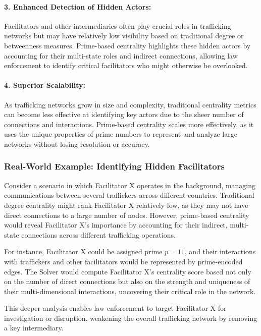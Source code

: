 \documentclass[%
 preprint, linenumbers,
 amsmath,amssymb,
 aps, physrev,
]{revtex4-2}
\begin{document}
\paragraph{3. Enhanced Detection of Hidden Actors:}
Facilitators and other intermediaries often play crucial roles in trafficking networks but may have relatively low visibility based on traditional degree or betweenness measures. Prime-based centrality highlights these hidden actors by accounting for their multi-state roles and indirect connections, allowing law enforcement to identify critical facilitators who might otherwise be overlooked.

\paragraph{4. Superior Scalability:}
As trafficking networks grow in size and complexity, traditional centrality metrics can become less effective at identifying key actors due to the sheer number of connections and interactions. Prime-based centrality scales more effectively, as it uses the unique properties of prime numbers to represent and analyze large networks without losing resolution or accuracy.

\subsubsection{Real-World Example: Identifying Hidden Facilitators}

Consider a scenario in which Facilitator X operates in the background, managing communications between several traffickers across different countries. Traditional degree centrality might rank Facilitator X relatively low, as they may not have direct connections to a large number of nodes. However, prime-based centrality would reveal Facilitator X’s importance by accounting for their indirect, multi-state connections across different trafficking operations.

For instance, Facilitator X could be assigned prime \(p = 11\), and their interactions with traffickers and other facilitators would be represented by prime-encoded edges. The Solver would compute Facilitator X’s centrality score based not only on the number of direct connections but also on the strength and uniqueness of their multi-dimensional interactions, uncovering their critical role in the network.

This deeper analysis enables law enforcement to target Facilitator X for investigation or disruption, weakening the overall trafficking network by removing a key intermediary.
\end{document}
